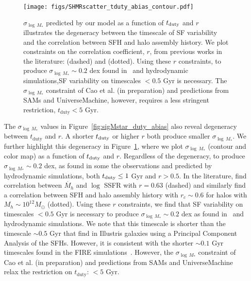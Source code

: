 \documentclass[12pt, letterpaper, preprint, tighten]{aastex62}
\begin{document}
\begin{figure}
\begin{center}
\texttt{[image: figs/SHMRscatter\_tduty\_abias\_contour.pdf]}
    \caption{$\sigma_{\log\,M_*}$ predicted by our model as a function of 
    $t_{\rm duty}$ and $r$ illustrates the degeneracy between the timescale of 
    SF variability and the correlation between SFH and halo assembly history. 
    We plot constraints on the correlation coefficient, $r$, from previous
    works in the literature: \cite{tinker2018b} (dashed) and \cite{behroozi2018} 
    (dotted). Using these $r$ constraints, to produce $\sigma_{\log\,M_*} \sim 0.2$ dex
    found in~\cite{more2011, leauthaud2012, reddick2013, tinker2013, zu2015} and 
    hydrodynamic simulations,SF variability on timescales $< 0.5$ Gyr is necessary.
    The $\sigma_{\log\,M_*}$ constraint of Cao et al. (in preparation) and predictions 
    from SAMs and {\sc UniverseMachine}, however, requires a less stringent 
    restriction, $t_\mathrm{duty} < 5$ Gyr. 
    }
\label{fig:r_tduty}
\end{center}
\end{figure}

The $\sigma_{\log\,M_*}$ values in Figure~\ref{fig:sigMstar_duty_abias} 
also reveal degeneracy between $t_\mathrm{duty}$ and $r$. A shorter
$t_{\rm duty}$ or higher $r$ both produce smaller $\sigma_{\log\,M_*}$. 
We further highlight this degeneracy in Figure~\ref{fig:r_tduty}, where 
we plot $\sigma_{\log\,M_*}$ (contour and color map) as a function of 
$t_{\rm duty}$ and $r$. Regardless of the degeneracy, to produce 
$\sigma_{\log\,M_*} \sim 0.2$ dex, as found in some the observations 
and predicted by hydrodynamic simulations, both $t_{\rm duty} \leq 1$ Gyr 
and $r > 0.5$. In the literature, \cite{tinker2018b} find correlation 
between $\dot{M_h}$ and $\log$ SSFR with $r = 0.63$ (dashed) and 
\cite{behroozi2018} similarly find a correlation between SFH and halo 
assembly history with $r_c \sim 0.6$ for halos with $M_h \sim 10^{12}M_\odot$ 
(dotted). Using these $r$ constraints, we find that SF variability on 
timescales $< 0.5$ Gyr is necessary to produce $\sigma_{\log\,M_*} \sim 0.2$ dex
as found in~\cite{more2011, leauthaud2012, reddick2013, tinker2013, zu2015} 
and hydrodynamic simulations. We note that this timescale is shorter than 
the timescale $\sim 0.5$ Gyr that \cite{sparre2015} find in Illustris galaxies 
using a Principal Component Analysis of the SFHs. However, it is consistent with 
the shorter $\sim 0.1$ Gyr timescales found in the FIRE simulations~\citep{hopkins2014, sparre2017}. 
However, the $\sigma_{\log\,M_*}$ constraint of Cao et al. (in preparation) and 
predictions from SAMs and {\sc UniverseMachine} relax the restriction on 
$t_\mathrm{duty}$: $< 5$ Gyr. 
\end{document}
